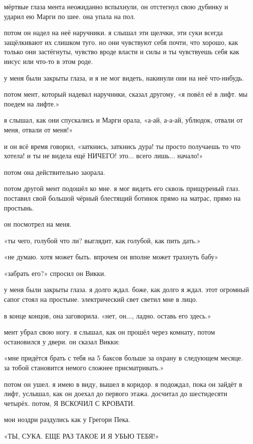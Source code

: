мёртвые глаза мента неожиданно вспыхнули, он отстегнул свою дубинку и 
ударил ею Марги по шее.
она упала на пол.

потом он надел на неё наручники.
я слышал эти щелчки, эти суки всегда
защёлкивают их слишком туго.
но они чувствуют себя почти, что хорошо, как только
они застёгнуты, чувство вроде власти и силы и ты чувствуешь себя как иисус или 
что-то в этом роде.

у меня были закрыты глаза, и я не мог видеть, накинули они на неё что-нибудь.

потом мент, который надевал наручники, сказал другому, «я повёл её в лифт.
мы поедем на лифте.»

я слышал, как они спускались и Марги орала, «а-ай, а-а-ай, ублюдок, отвали
от меня, отвали от меня!»

и он всё время говорил, «заткнись, заткнись дура! ты просто получаешь то 
что хотела! и ты не видела ещё НИЧЕГО!  это... всего лишь... начало!»

потом она действительно заорала.

потом другой мент подошёл ко мне.
я мог видеть его сквозь прищуреный
глаз.
поставил свой большой чёрный блестящий ботинок прямо на матрас, прямо на
простынь.

он посмотрел на меня.

«ты чего, голубой что ли? выглядит, как голубой, как пить дать.»

«не думаю.
хотя может быть.
впрочем он вполне может трахнуть бабу»

«забрать его?» спросил он Викки.

у меня были закрыты глаза.
я долго ждал.
боже, как долго я ждал.
этот
огромный сапог стоял на простыне.
электрический свет светил мне в лицо.

в конце концов, она заговорила.
«нет, он..., ладно.
оставь его здесь.»

мент убрал свою ногу.
я слышал, как он прошёл через комнату, потом
остановился у двери.
он сказал Викки:

«мне придётся брать с тебя на 5 баксов больше за охрану в следующем месяце.
за тобой становится немого сложнее присматривать.»

потом он ушел.
я имею в виду, вышел в коридор.
я подождал, пока он зайдёт в
лифт, услышал, как он доехал до первого этажа.
досчитал до шестидесяти четырёх.
потом, Я ВСКОЧИЛ С КРОВАТИ.

мои ноздри  раздулись как у Грегори Пека.

«ТЫ, СУКА.
ЕЩЕ РАЗ ТАКОЕ И Я УБЬЮ ТЕБЯ!»

